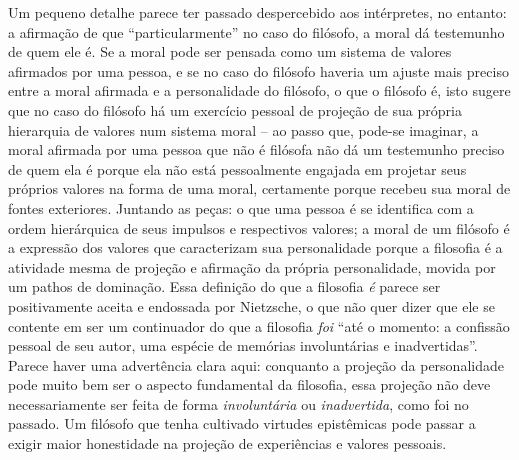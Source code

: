 \documentclass[
	12pt,				%
	openright,			%
	oneside,			%
	a4paper,			%
	english,			%
	french,				%
	spanish,			%
	brazil				%
	]{abntex2}
\begin{document}
Um pequeno detalhe parece ter passado despercebido aos intérpretes, no entanto: a afirmação de que “particularmente” no caso do filósofo, a moral dá testemunho de quem ele é. Se a moral pode ser pensada como um sistema de valores afirmados por uma pessoa, e se no caso do filósofo haveria um ajuste mais preciso entre a moral afirmada e a personalidade do filósofo, o que o filósofo é, isto sugere que no caso do filósofo há um exercício pessoal de projeção de sua própria hierarquia de valores num sistema moral – ao passo que, pode-se imaginar, a moral afirmada por uma pessoa que não é filósofa não dá um testemunho preciso de quem ela é porque ela não está pessoalmente engajada em projetar seus próprios valores na forma de uma moral, certamente porque recebeu sua moral de fontes exteriores. Juntando as peças: o que uma pessoa é se identifica com a ordem hierárquica de seus impulsos e respectivos valores; a moral de um filósofo é a expressão dos valores que caracterizam sua personalidade porque a filosofia é a atividade mesma de projeção e afirmação da própria personalidade, movida por um pathos de dominação. Essa definição do que a filosofia \textit{é} parece ser positivamente aceita e endossada por Nietzsche, o que não quer dizer que ele se contente em ser um continuador do que a filosofia \textit{foi} “até o momento: a confissão pessoal de seu autor, uma espécie de memórias involuntárias e inadvertidas”. Parece haver uma advertência clara aqui: conquanto a projeção da personalidade pode muito bem ser o aspecto fundamental da filosofia,  essa projeção não deve necessariamente ser feita de forma \textit{involuntária} ou \textit{inadvertida}, como foi no passado. Um filósofo que tenha cultivado virtudes epistêmicas pode passar a exigir maior honestidade na projeção de experiências e valores pessoais.
\end{document}

